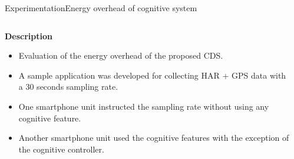 \begin{frame}{Experimentation}{Energy overhead of cognitive system}
\small
\vspace{-0.5cm}
\begin{columns}
\begin{column}[T]{0.55\textwidth}
\begin{block}{\small \textbf{Description}}
\begin{itemize}
  \item Evaluation of the energy overhead of the proposed CDS.
  \item A sample application was developed for collecting HAR + GPS data with a 30 seconds sampling rate.
  \item One smartphone unit instructed the sampling rate without using any cognitive feature.
  \item Another smartphone unit used the cognitive features with the exception of the cognitive controller.
\end{itemize}
\end{block}
\end{column}

\begin{column}[T]{0.45\textwidth}
\begin{table}
\centering
\renewcommand{\arraystretch}{0.8}
\caption{Input parameters for the energy overhead measurement experiment (\emph{Geofencing} and \emph{Stay Points Detector} enabled only in one smartphone).}
\end{table}
\end{column}
\end{columns}


\end{frame}
